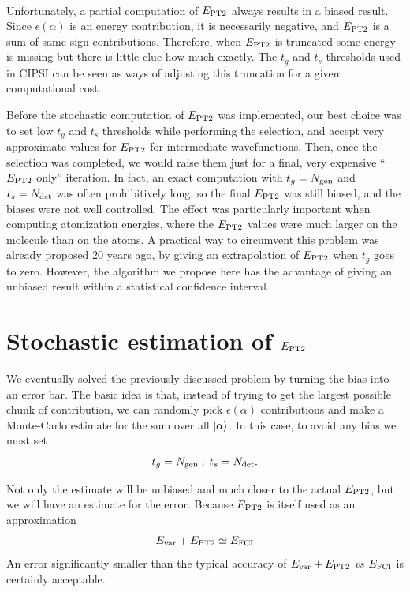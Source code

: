 \documentclass[./thesis.tex]{subfiles}
\begin{document}
\paragraph{}

Unfortunately, a partial computation of $E_\text{PT2}$ always results in a biased result. Since $\epsilon(\alpha)$ is an energy contribution, it is necessarily negative, and $E_\text{PT2}$ is a sum of same-sign contributions. Therefore, when $E_\text{PT2}$ is truncated some energy is missing but there is little clue how much exactly. The $t_g$ and $t_s$ thresholds used in CIPSI can be seen as ways of adjusting this truncation for a given computational cost.

Before the stochastic computation of $E_\text{PT2}$ was implemented, our best choice was to set low $t_g$ and $t_s$ thresholds while performing the selection, and accept very approximate values for $E_\text{PT2}$ for intermediate wavefunctions. Then, once the selection was completed, we would raise them just for a final, very expensive ``$E_\text{PT2}$ only'' iteration. In fact, an exact computation with $t_g={N_\text{gen}}$ and $t_s={N_\text{det}}$ was often prohibitively long, so the final $E_\text{PT2}$ was still biased, and the biases were not well controlled. The effect was particularly important when computing atomization energies, where the $E_\text{PT2}$ values were much larger on the molecule than on the atoms.
A practical way to circumvent this problem was already proposed 20 years ago, by giving an extrapolation of $E_\text{PT2}$ when $t_g$ goes to zero.\cite{Angeli_1997} However, the algorithm we propose here has the advantage of giving an unbiased result within a statistical confidence interval.

\section{Stochastic estimation of $E_\text{PT2}$}

We eventually solved the previously discussed problem by turning the bias into an error bar. The basic idea is that, instead of trying to get the largest possible chunk of contribution, we can randomly pick $\epsilon(\alpha)$ contributions and make a Monte-Carlo estimate for the sum over all $\ket \alpha$. In this case, to avoid any bias we must set
\begin{equation}
t_g = {N_\text{gen}} \; ; \; t_s = {N_\text{det}}.
\end{equation}

Not only the estimate will be unbiased and much closer to the actual $E_\text{PT2}$, but we will have an estimate for the error. Because $E_\text{PT2}$ is itself used as an approximation
\begin{equation}
E_\text{var} + E_\text{PT2} \simeq E_\text{FCI}
\end{equation}
An error significantly smaller than the typical accuracy of $E_\text{var} + E_\text{PT2}$ \textit{vs} $E_\text{FCI}$ is certainly acceptable.
\end{document}
